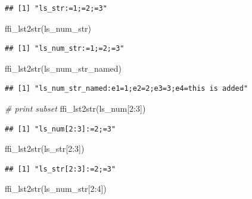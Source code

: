 \documentclass[
]{book}
\newenvironment{Shaded}{\begin{snugshade}}{\end{snugshade}}
\newcommand{\CommentTok}[1]{\textcolor[rgb]{0.56,0.35,0.01}{\textit{#1}}}
\newcommand{\DecValTok}[1]{\textcolor[rgb]{0.00,0.00,0.81}{#1}}
\newcommand{\FunctionTok}[1]{\textcolor[rgb]{0.00,0.00,0.00}{#1}}
\newcommand{\NormalTok}[1]{#1}
\newcommand{\SpecialCharTok}[1]{\textcolor[rgb]{0.00,0.00,0.00}{#1}}
\begin{document}
\begin{verbatim}
## [1] "ls_str:=1;=2;=3"
\end{verbatim}

\begin{Shaded}
\begin{Highlighting}[]
\FunctionTok{ffi\_lst2str}\NormalTok{(ls\_num\_str)}
\end{Highlighting}
\end{Shaded}

\begin{verbatim}
## [1] "ls_num_str:=1;=2;=3"
\end{verbatim}

\begin{Shaded}
\begin{Highlighting}[]
\FunctionTok{ffi\_lst2str}\NormalTok{(ls\_num\_str\_named)}
\end{Highlighting}
\end{Shaded}

\begin{verbatim}
## [1] "ls_num_str_named:e1=1;e2=2;e3=3;e4=this is added"
\end{verbatim}

\begin{Shaded}
\begin{Highlighting}[]
\CommentTok{\# print subset}
\FunctionTok{ffi\_lst2str}\NormalTok{(ls\_num[}\DecValTok{2}\SpecialCharTok{:}\DecValTok{3}\NormalTok{])}
\end{Highlighting}
\end{Shaded}

\begin{verbatim}
## [1] "ls_num[2:3]:=2;=3"
\end{verbatim}

\begin{Shaded}
\begin{Highlighting}[]
\FunctionTok{ffi\_lst2str}\NormalTok{(ls\_str[}\DecValTok{2}\SpecialCharTok{:}\DecValTok{3}\NormalTok{])}
\end{Highlighting}
\end{Shaded}

\begin{verbatim}
## [1] "ls_str[2:3]:=2;=3"
\end{verbatim}

\begin{Shaded}
\begin{Highlighting}[]
\FunctionTok{ffi\_lst2str}\NormalTok{(ls\_num\_str[}\DecValTok{2}\SpecialCharTok{:}\DecValTok{4}\NormalTok{])}
\end{Highlighting}
\end{Shaded}
\end{document}

